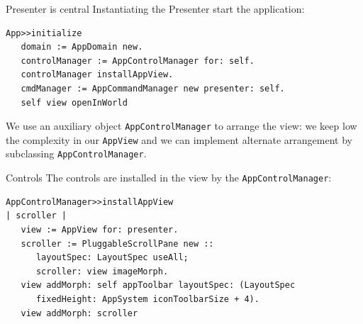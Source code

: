 \documentclass{beamer}
\begin{document}
\begin{frame}[fragile]{Presenter is central}
    \fontsize{10pt}{8pt}\selectfont
Instantiating the Presenter start the application:
\begin{lstlisting}[language=Smalltalk]
App>>initialize
   domain := AppDomain new.
   controlManager := AppControlManager for: self.
   controlManager installAppView.
   cmdManager := AppCommandManager new presenter: self.
   self view openInWorld 
 \end{lstlisting}
 We use an auxiliary object \texttt{AppControlManager} to arrange the
 view: we keep low the complexity in our \texttt{AppView} and we can
 implement alternate arrangement by subclassing
 \texttt{AppControlManager}.
\end{frame}

\begin{frame}[fragile]{Controls}
  \fontsize{10pt}{8pt}\selectfont
  The controls are installed in the view by the
  \texttt{AppControlManager}:
  \begin{lstlisting}[language=Smalltalk]
AppControlManager>>installAppView
| scroller |
   view := AppView for: presenter.
   scroller := PluggableScrollPane new :: 
      layoutSpec: LayoutSpec useAll;
      scroller: view imageMorph.	
   view addMorph: self appToolbar layoutSpec: (LayoutSpec
      fixedHeight: AppSystem iconToolbarSize + 4).
   view addMorph: scroller    
  \end{lstlisting} 
\end{frame}
\end{document}
